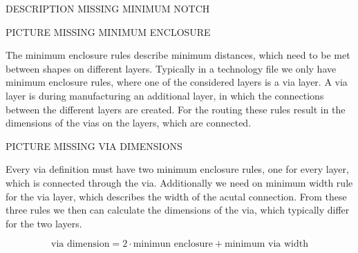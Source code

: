 DESCRIPTION MISSING MINIMUM NOTCH

PICTURE MISSING MINIMUM ENCLOSURE

The minimum enclosure rules describe minimum distances, which need to be met between shapes on different layers. Typically in a technology file we only have minimum enclosure rules, where one of the considered layers is a via layer. A via layer is during manufacturing an additional layer, in which the connections between the different layers are created. For the routing these rules result in the dimensions of the vias on the layers, which are connected.

PICTURE MISSING VIA DIMENSIONS

Every via definition must have two minimum enclosure rules, one for every layer, which is connected through the via. Additionally we need on minimum width rule for the via layer, which describes the width of the acutal connection. From these three rules we then can calculate the dimensions of the via, which typically differ for the two layers.

\[\text{via dimension} = 2 \cdot \text{minimun enclosure} + \text{minimum via width}\]